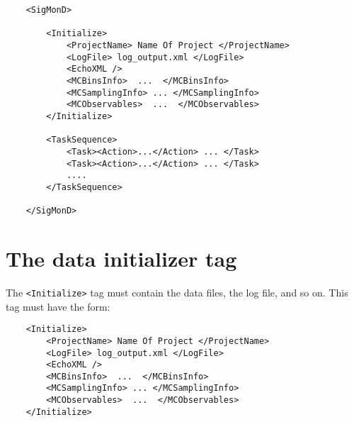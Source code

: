 \documentclass[12pt]{article}
\newcommand{\vb}{\texttt}
\begin{document}
\begin{verbatim}
    <SigMonD>

        <Initialize>
            <ProjectName> Name Of Project </ProjectName>
            <LogFile> log_output.xml </LogFile>
            <EchoXML />
            <MCBinsInfo>  ...  </MCBinsInfo> 
            <MCSamplingInfo> ... </MCSamplingInfo>
            <MCObservables>  ...  </MCObservables>
        </Initialize>

        <TaskSequence>
            <Task><Action>...</Action> ... </Task>
            <Task><Action>...</Action> ... </Task>
            .... 
        </TaskSequence>

    </SigMonD>
\end{verbatim}

\section{The data initializer tag}
The \vb{<Initialize>} tag must contain the data files, the log file, and so on. 
This tag must have the form:
\begin{verbatim}
    <Initialize>
        <ProjectName> Name Of Project </ProjectName>
        <LogFile> log_output.xml </LogFile>
        <EchoXML />
        <MCBinsInfo>  ...  </MCBinsInfo> 
        <MCSamplingInfo> ... </MCSamplingInfo>
        <MCObservables>  ...  </MCObservables>
    </Initialize>
\end{verbatim}
\end{document}
